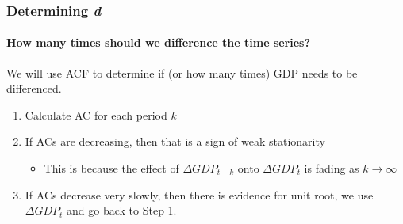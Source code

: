 \begin{frame}
    \frametitle{Determining \textit{d}}
    \framesubtitle{How many times should we difference the time series?}

    We will use ACF to determine if (or how many times) GDP needs to be differenced.

    \begin{enumerate}
        \item Calculate AC for each period $k$
        \item If ACs are decreasing, then that is a sign of weak stationarity
              \begin{itemize}
                  \item This is because the effect of ${\Delta GDP}_{t-k}$ onto ${\Delta GDP}_t$ is fading as $k \to \infty$
              \end{itemize}
        \item If ACs decrease very slowly, then there is evidence for unit root, we use $\Delta {GDP}_t$ and go back to Step 1.
    \end{enumerate}

\end{frame}